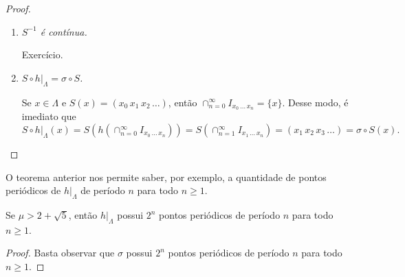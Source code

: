 \begin{proof}
\begin{enumerate}[label=\alph*)]
\item \textit{$S^{-1}$ é contínua.}

Exercício.

\item \textit{$S \circ h|_\Lambda = \sigma \circ S$.}

Se $x \in \Lambda$ e $S(x) = (x_0 \, x_1 \, x_2 \, \dots)$, então $\cap_{n=0}^\infty I_{x_0 \, \dots \, x_n} = \lbrace x \rbrace$. Desse modo, é imediato que
$$ S \circ h|_{\Lambda}(x) = S(h(\cap_{n=0}^\infty I_{x_0 \, \dots \, x_n})) = S(\cap_{n=1}^\infty I_{x_1 \, \dots \, x_n}) = (x_1 \, x_2 \, x_3 \, \dots)  = \sigma \circ S(x).$$
\end{enumerate}
\end{proof}

O teorema anterior nos permite saber, por exemplo, a quantidade de pontos periódicos de $h|_\Lambda$ de período $n$ para todo $n \geq 1$.

\begin{corollary}
Se $\mu > 2 + \sqrt{5}$, então $h|_\Lambda$ possui $2^n$ pontos periódicos de período $n$ para todo $n \geq 1$.
\end{corollary}

\begin{proof}
Basta observar que $\sigma$ possui $2^n$ pontos periódicos de período $n$ para todo $n \geq 1$.
\end{proof}

